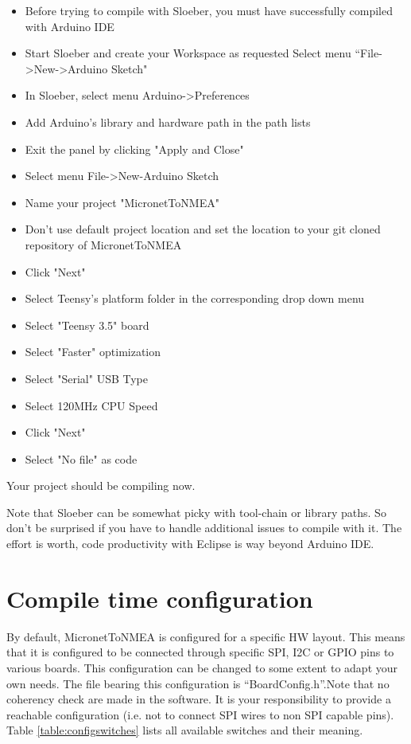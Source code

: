 \documentclass{report}
\begin{document}
\begin{itemize}
\item Before trying to compile with Sloeber, you must have successfully compiled with Arduino IDE
\item Start Sloeber and create your Workspace as requested Select menu “File->New->Arduino Sketch"
\item In Sloeber, select menu Arduino->Preferences
\item Add Arduino's library and hardware path in the path lists
\item Exit the panel by clicking "Apply and Close"
\item Select menu File->New-Arduino Sketch
\item Name your project "MicronetToNMEA"
\item Don't use default project location and set the location to your git cloned repository of MicronetToNMEA
\item Click "Next"
\item Select Teensy's platform folder
in the corresponding drop down menu
\item Select "Teensy 3.5" board
\item Select "Faster" optimization
\item Select "Serial" USB Type
\item Select 120MHz CPU Speed
\item Click "Next"
\item Select "No file" as code
\end{itemize}

Your project should be compiling now.

Note that Sloeber can be somewhat picky with tool-chain or library paths. So don’t be surprised if you have to handle additional issues to compile with it. The effort is worth, code productivity with Eclipse is way beyond Arduino IDE.

\section{Compile time configuration}

By default, MicronetToNMEA is configured for a specific HW layout. This means that it is configured to be connected through specific SPI, I2C or GPIO pins to various boards. This configuration can be changed to some extent to adapt your own needs. The file bearing this configuration is “BoardConfig.h”.Note that no coherency check are made in the software. It is your responsibility to provide a reachable configuration (i.e. not to connect SPI wires to non SPI capable pins). Table {\ref{table:configswitches}} lists all available switches and their meaning.
\end{document}
